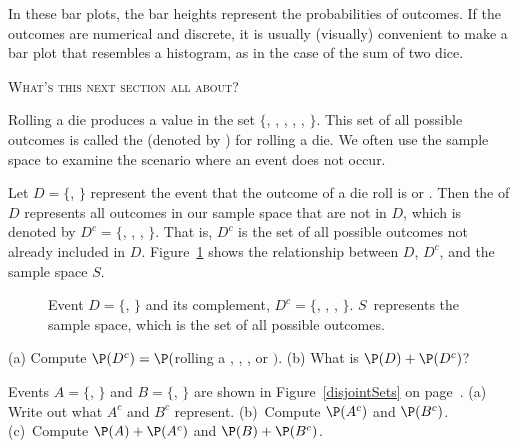 \documentclass{ccg-topic}
\begin{document}
In these bar plots, the bar heights represent the probabilities of outcomes. If the outcomes are numerical and discrete, it is usually (visually) convenient to make a bar plot that resembles a histogram, as in the case of the sum of two dice. 

\vspace{1em}\noindent\textsc{What's this next section all about?} 
\vspace{1em}

Rolling a die produces a value in the set $\{$, , , , , $\}$. This set of all possible outcomes is called the  (denoted by ) for rolling a die. We often use the sample space to examine the scenario where an event does not occur.

Let $D=\{$, $\}$ represent the event that the outcome of a die roll is  or . Then the  of $D$ represents all outcomes in our sample space that are not in $D$, which is denoted by $D^c = \{$, , , $\}$. That is, $D^c$ is the set of all possible outcomes not already included in $D$. Figure~\ref{complementOfD} shows the relationship between $D$, $D^c$, and the sample space $S$. 

\begin{figure}[hht]
  \centering
  \caption{Event $D=\{$, $\}$ and its complement,
      $D^c = \{$, , , $\}$.
      $S$~represents the sample space, which is the set of
      all possible outcomes.}
  \label{complementOfD}
\end{figure}

\begin{todo}
(a) Compute $\P(D^c) = \P($rolling a , , , or $)$. (b) What is $\P(D) + \P(D^c)$?\footnotemark
\end{todo}

\begin{todo}
Events $A=\{$, $\}$ and $B=\{$, $\}$ are shown in Figure~\ref{disjointSets} on page~\pageref{disjointSets}. (a) Write out what $A^c$ and $B^c$ represent. (b)~Compute $\P(A^c)$ and $\P(B^c)$. (c)~Compute $\P(A)+\P(A^c)$ and $\P(B)+\P(B^c)$.\footnotemark
\end{todo}
\end{document}
